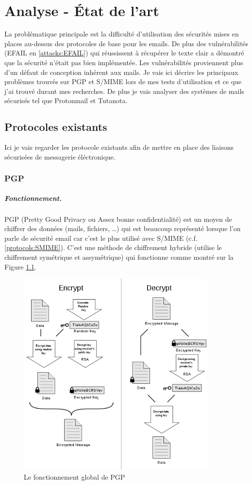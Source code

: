 \chapter{Analyse - État de l'art}
\label{ch:analysis}
La problématique principale est la difficulté d’utilisation des sécurités mises en places au-dessus des protocoles de base pour les emails. 
De plus des vulnérabilités (EFAIL en \ref{attacks:EFAIL}) qui réussissent à récupérer le texte clair a démontré que la sécurité n’était pas bien implémentée. Les vulnérabilités proviennent plus d'un défaut de conception inhérent aux mails.
Je vais ici décrire les principaux problèmes trouvés sur PGP et S/MIME lors de mes tests d’utilisation et ce que j’ai trouvé durant mes recherches. De plus je vais analyser des systèmes de mails sécurisés tel que Protonmail et Tutanota.
\section{Protocoles existants}
Ici je vais regarder les protocole existants afin de mettre en place des liaisons sécurisées de messagerie éléctronique.
\subsection{PGP}
\paragraph*{Fonctionnement.}
PGP (Pretty Good Privacy ou Assez bonne confidentialité) est un moyen de chiffrer des données (mails, fichiers, …) qui est beaucoup représenté lorsque l’on parle de sécurité email car c’est le plus utilisé avec S/MIME (c.f. \ref{protocols:SMIME}). C’est une méthode de chiffrement hybride (utilise le chiffrement symétrique et assymétrique) qui fonctionne comme montré sur la Figure \ref{fig:PGP_101}.

\begin{figure}[h!]
\includegraphics[width=10cm]{images/PGP_101.png}
\centering
\caption{Le fonctionnement global de PGP}
\label{fig:PGP_101}
\end{figure}


